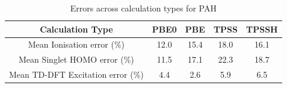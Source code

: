 \documentclass[12pt]{article}
\begin{document}

\newpage

\begin{table}[h]
\caption{Errors across calculation types for PAH}
\begin{tabular}{c c c c c }
\hline
Calculation Type & PBE0 & PBE & TPSS & TPSSH \\
\hline
Mean Ionisation  error (\%) & 12.0 & 15.4 & 18.0 & 16.1 \\
Mean Singlet HOMO  error (\%) & 11.5 & 17.1 & 22.3 & 18.7 \\
Mean TD-DFT Excitation error (\%) & 4.4 & 2.6 & 5.9 & 6.5 \\ 
\hline
\end{tabular}
\label{table:ring_system_errors}
\end{table}
\end{document}
